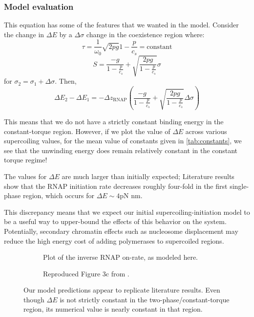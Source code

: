 \documentclass[11pt]{article}
\begin{document}
\FloatBarrier
\subsubsection{Model evaluation}
This equation has some of the features that we wanted in the model. Consider the change in \(\Delta E\) by a \(\Delta \sigma\) change in the coexistence region where:
\[\tau = \frac{1}{\omega_0} \sqrt{2pg}{1 - \frac{p}{c_s}} = \text{constant}\]
\[S = \frac{-g}{1 - \frac{p}{c_s}} + \sqrt{\frac{2pg}{1 - \frac{p}{c_s}}} \sigma\]
for \(\sigma_2 = \sigma_1 + \Delta \sigma\). Then,
\[\Delta E_2 - \Delta E_1 = - \Delta z_\text{RNAP} \left( \frac{-g}{1 - \frac{p}{c_s}} + \sqrt{\frac{2pg}{1-\frac{p}{c_s}}} \Delta \sigma\right)\]

This means that we do not have a strictly constant binding energy in the constant-torque region. However, if we plot the value of \(\Delta E\) across various supercoiling values, for the mean value of constants given in \autoref{tab:constants}, we see that the unwinding energy does remain relatively constant in the constant torque regime!

The values for \(\Delta E\) are much larger than initially expected; Literature results show that the RNAP initiation rate decreases roughly four-fold in the first single-phase region, which occurs for \(\Delta E \sim 4 \text{pN nm}\).

This discrepancy means that we expect our initial supercoiling-initiation model to be a useful way to upper-bound the effects of this behavior on the system. Potentially, secondary chromatin effects such as nucleosome displacement may reduce the high energy cost of adding polymerases to supercoiled regions.

\begin{figure}[h]
    \centering
    \begin{subfigure}{.49\linewidth}
        \centering
        \caption{Plot of the inverse RNAP on-rate, as modeled here.}
    \end{subfigure}
    \begin{subfigure}{.49\linewidth}
        \centering
        \caption{Reproduced Figure 3c from \textcite{revyakinPromoterUnwindingPromoter2004}.}
    \end{subfigure}
    \caption{Our model predictions appear to replicate literature results. Even though \(\Delta E\) is not strictly constant in the two-phase/constant-torque region, its numerical value is nearly constant in that region.}
\end{figure}
\end{document}
